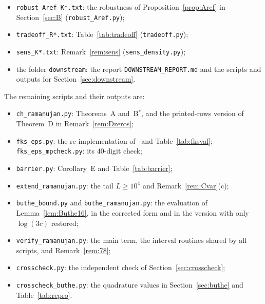 \documentclass{amsart}
\theoremstyle{definition}
\theoremstyle{remark}
\theoremstyle{plain}
\numberwithin{equation}{section}
\newcommand{\Bstar}{B$^*$}
\begin{document}
\begin{itemize}
\item \texttt{robust\_\allowbreak{}Aref\_\allowbreak{}K*.txt}: the robustness of Proposition~\ref{prop:Aref} in Section~\ref{sec:B} (\texttt{robust\_\allowbreak{}Aref.py});
\item \texttt{tradeoff\_\allowbreak{}R*.txt}: Table~\ref{tab:tradeoff} (\texttt{tradeoff.py});
\item \texttt{sens\_\allowbreak{}K*.txt}: Remark~\ref{rem:sens} (\texttt{sens\_\allowbreak{}density.py});
\item the folder \texttt{downstream}: the report \texttt{DOWNSTREAM\_\allowbreak{}REPORT.md} and the scripts and outputs for Section~\ref{sec:downstream}.
\end{itemize}
The remaining scripts and their outputs are:
\begin{itemize}
\item \texttt{ch\_\allowbreak{}ramanujan.py}: Theorems~A and~\Bstar, and the printed-rows version of Theorem~D in Remark~\ref{rem:Dzeros};
\item \texttt{fks\_\allowbreak{}eps.py}: the re-implementation of~\cite[Thm.~1.1]{FKS23} and Table~\ref{tab:fksval}; \texttt{fks\_\allowbreak{}eps\_\allowbreak{}mpcheck.py}: its $40$-digit check;
\item \texttt{barrier.py}: Corollary~E and Table~\ref{tab:barrier};
\item \texttt{extend\_\allowbreak{}ramanujan.py}: the tail $L\ge10^4$ and Remark~\ref{rem:Cvar}(c);
\item \texttt{buthe\_\allowbreak{}bound.py} and \texttt{buthe\_\allowbreak{}ramanujan.py}: the evaluation of Lemma~\ref{lem:Buthe16}, in the corrected form and in the version with only $\log(3c)$ restored;
\item \texttt{verify\_\allowbreak{}ramanujan.py}: the main term, the interval routines shared by all scripts, and Remark~\ref{rem:78};
\item \texttt{crosscheck.py}: the independent check of Section~\ref{sec:crosscheck};
\item \texttt{crosscheck\_\allowbreak{}buthe.py}: the quadrature values in Section~\ref{sec:buthe} and Table~\ref{tab:repro}.
\end{itemize}
\end{document}
